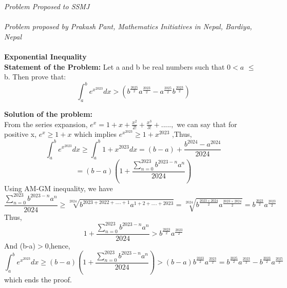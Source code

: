 \documentclass[12pt]{article}
\begin{document}
\textit{Problem Proposed to SSMJ }\\ \\
\textit{Problem proposed by Prakash Pant, Mathematics Initiatives in Nepal, Bardiya, Nepal}\\ \\
\textbf{ Exponential Inequality} \\
\textbf{Statement of the Problem:}
Let a and b be real numbers such that $0<a$ $\le$ b. Then prove that:
\[ \int_a^b e^{x^{2023}} dx >  \left( b^{\frac{2025}{2}}a^{\frac{2023}{2}}-a^{\frac{2025}{2}} b^{\frac{2023}{2}} \right) \]

\textbf{ Solution of the problem: } \\ 
From the series expansion, $e^x = 1 + x+ \frac{x^2}{2!}+ \frac{x^3}{3!}+.....,$ we can say that for positive x, $ e^x \ge 1+x $  which implies $e^{x^{2023}} \ge 1+x^{2023} $ ,Thus,
\[ \int_a^b e^{x^{2023}} dx \ge \int_a^b 1+x^{2023} dx = (b-a)+ \frac{b^{2024}-a^{2024}}{2024} \]
\[  = (b-a)\left( 1+ \frac{\sum_{n=0}^{2023} b^{2023-n}a^n}{2024} \right) \]
Using AM-GM inequality, we have
\[  \frac{\sum_{n=0}^{2023} b^{2023-n}a^n}{2024} \ge \sqrt[2024]{b^{2023+2022+....+1}a^{1+2+....+2023}}=\sqrt[2024]{b^{\frac{2023\times 2024}{2}}a^{\frac{2023 \times 2024}{2}}} = b^{\frac{2023}{2}}a^{\frac{2023 }{2}} \]
 Thus, 
\[  1+\frac{\sum_{n=0}^{2023} b^{2023-n}a^n}{2024} > b^{\frac{2023}{2}}a^{\frac{2023 }{2}} \] 
And (b-a)$>$0,hence,
\[ \int_a^b e^{x^{2023} }dx \ge (b-a)\left( 1+ \frac{\sum_{n=0}^{2023} b^{2023-n}a^n}{2024} \right) >(b-a)  b^{\frac{2023}{2}}a^{\frac{2023 }{2}} = b^{\frac{2025}{2}}a^{\frac{2023 }{2}}-b^{\frac{2023}{2}}a^{\frac{2025 }{2}}  \] 
which ends the proof.



					
\end{document}
